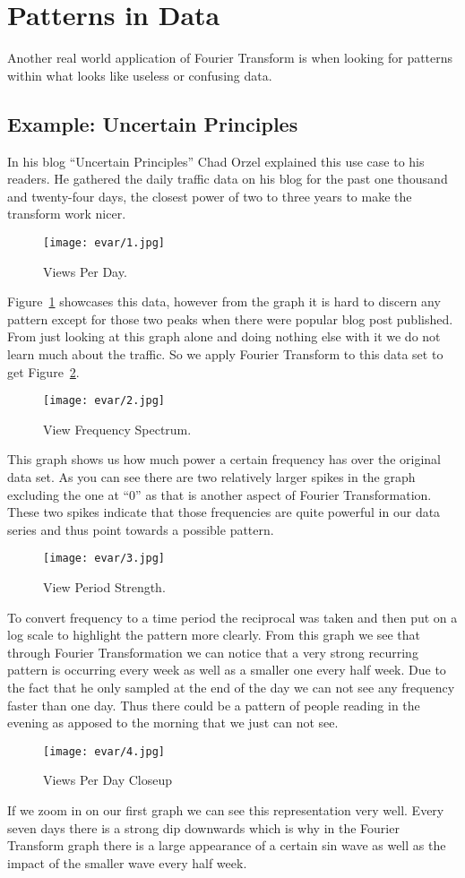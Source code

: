 \documentclass [../article.tex]{subfiles}
\begin{document}
  \section{Patterns in Data}
  Another real world application of Fourier Transform is when
  looking for patterns within what looks like useless or
  confusing data.
  \subsection{Example: Uncertain Principles}
  In his blog ``Uncertain Principles'' Chad Orzel explained this use
  case to his readers. He gathered the daily traffic data on his
  blog for the past one thousand and twenty-four days, the closest
  power of two to three years to make the transform work nicer.
  \begin{figure}[htbp]
    \centering
    \texttt{[image: evar/1.jpg]}
    \caption{Views Per Day.}
    \label{fig:views}
  \end{figure}
  Figure~\ref{fig:views} showcases this data, however from the
  graph it is hard to discern any pattern except for those two peaks
  when there were popular blog post published.
  From just looking at this graph
  alone and doing nothing else with it we do not learn much
  about the traffic. So we apply Fourier Transform to this
  data set to get Figure~\ref{fig:viewfreq}.
  \begin{figure}[htbp]
    \centering
    \texttt{[image: evar/2.jpg]}
    \caption{View Frequency Spectrum.}
    \label{fig:viewfreq}
  \end{figure}
  This graph shows us how much power a certain frequency has over
  the original data set. As you can see there are two relatively
  larger spikes in the graph excluding the one at ``0'' as that is
  another aspect of Fourier Transformation. These two spikes indicate
  that those frequencies are quite powerful in our data series and thus
  point towards a possible pattern.
  \begin{figure}[htbp]
    \centering
    \texttt{[image: evar/3.jpg]}
    \caption{View Period Strength.}
    \label{fig:viewperiods}
  \end{figure}
  To convert frequency to a time period the reciprocal was taken and then
  put on a log scale to highlight the pattern more clearly. From this graph
  we see that through Fourier Transformation we can notice that a very
  strong recurring pattern is occurring every week as well as a
  smaller one every half week. Due to the fact that he only sampled
  at the end of the day we can not see any frequency faster than one
  day. Thus there could be a pattern of people reading in the evening as
  apposed to the morning that we just can not see.
  \begin{figure}[htbp]
    \centering
    \texttt{[image: evar/4.jpg]}
    \caption{Views Per Day Closeup}
    \label{fig:viewcloseup}
  \end{figure}
  If we zoom in on our first graph we can see this representation very
  well. Every seven days there is a strong dip downwards  which is
  why in the Fourier Transform graph there is a large appearance of
  a certain sin wave as well as the impact of the smaller wave every
  half week.
\end{document}
